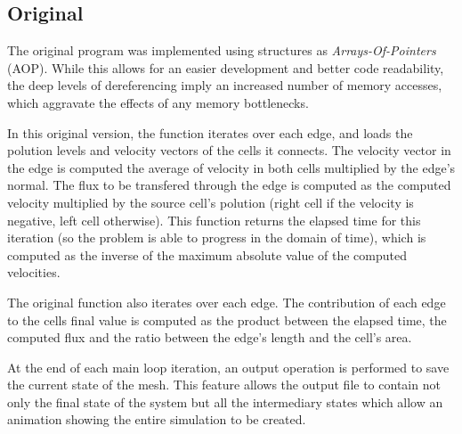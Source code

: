 \subsection{Original}
\label{sec:original}

The original \polu program was implemented using structures as \textit{Arrays-Of-Pointers} (AOP). While this allows for an easier development and better code readability, the deep levels of dereferencing imply an increased number of memory accesses, which aggravate the effects of any memory bottlenecks.

In this original version, the \computeflux function iterates over each edge, and loads the polution levels and velocity vectors of the cells it connects. The velocity vector in the edge is computed the average of velocity in both cells multiplied by the edge's normal. The flux to be transfered through the edge is computed as the computed velocity multiplied by the source cell's polution (right cell if the velocity is negative, left cell otherwise). This function returns the elapsed time for this iteration (so the problem is able to progress in the domain of time), which is computed as the inverse of the maximum absolute value of the computed velocities.

The original \update function also iterates over each edge. The contribution of each edge to the cells final value is computed as the product between the elapsed time, the computed flux and the ratio between the edge's length and the cell's area.

At the end of each main loop iteration, an output operation is performed to save the current state of the mesh. This feature allows the output file to contain not only the final state of the system but all the intermediary states which allow an animation showing the entire simulation to be created.

